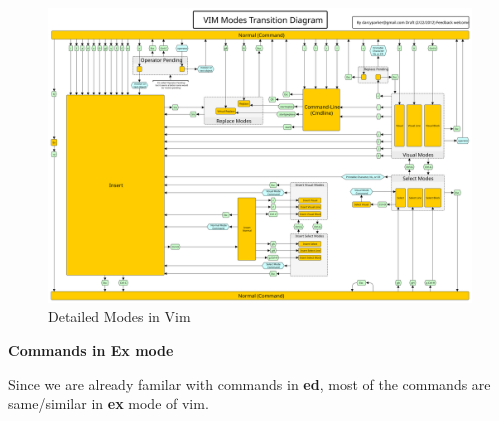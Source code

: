 \begin{figure}[h]
  \includegraphics{images/png/vim-modes.png}
  \caption{Detailed Modes in Vim}
\end{figure}

\textbf{Commands in Ex mode}

Since we are already familar with commands in
\textbf{ed}, most of the commands are same/similar
in \textbf{ex} mode of vim.


